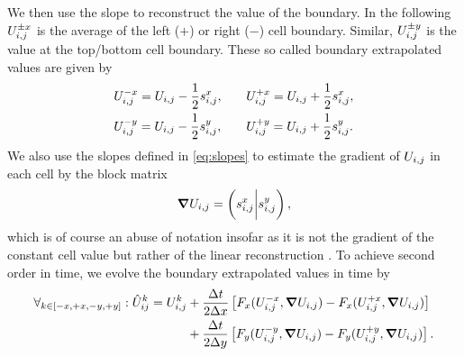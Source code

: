 We then use the slope to reconstruct the value of the boundary.
In the following $U_{i,j}^{\pm x}$ is the average of the left ($+$) or right ($-$) cell boundary.
Similar, $U_{i,j}^{\pm y}$ is the value at the top/bottom cell boundary.
These so called boundary extrapolated values are given by
\newcommand{\extrapolatedCellAvg}[3][i,j]{\cellAvg[#1]^{#3 #2} = \cellAvg #3 \frac{1}{2} \slope{#2}}
\begin{equation}
\begin{alignedat}{2}
& \extrapolatedCellAvg{x}{-} , \qquad && \extrapolatedCellAvg{x}{+}, \\
& \extrapolatedCellAvg{y}{-} , \qquad && \extrapolatedCellAvg{y}{+}.
\end{alignedat}
\end{equation}
We also use the slopes defined in \cref{eq:slopes} to estimate the gradient of $U_{i,j}$ in each cell by the block matrix
\begin{equation}
  \label{eq:muscl-gradient}
  \gradCellAvg = \left( \slope{x} \bigg\rvert \slope{y} \right),
\end{equation}
which is of course an abuse of notation insofar as it is not the gradient of the constant cell value but rather of the linear reconstruction .
To achieve second order in time, we evolve the boundary extrapolated values in time by
\newcommand{\evolvedCellAvg}[2][i,j]{\hat{U}_{#1}^{#2}}
\begin{equation}\label{eq:muscl-time-evolution}
  \begin{split}
  \forall_{k \in [-x, +x, -y, +y]}:  \hat{U}_{ij}^k = \cellAvg^k &+
  \frac{\Delta t}{2 \Delta x} \left[ \fluxX(\cellAvg^{-x}, \gradCellAvg) - \fluxX(\cellAvg^{+x}, \gradCellAvg) \right] \\&+
  \frac{\Delta t}{2 \Delta y} \left[ \fluxY(\cellAvg^{-y}, \gradCellAvg) - \fluxY(\cellAvg^{+y}, \gradCellAvg) \right].
  \end{split}
\end{equation}


